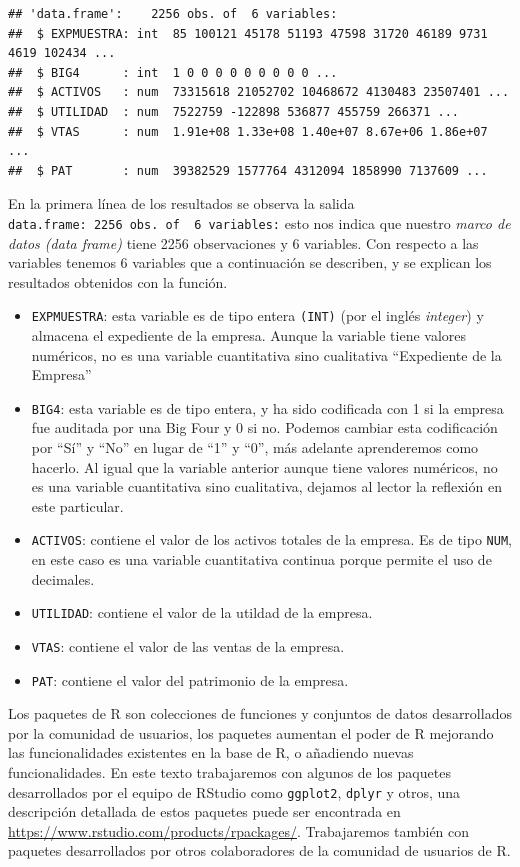 \documentclass[
]{krantz}
\providecommand{\tightlist}{%
  \setlength{\itemsep}{0pt}\setlength{\parskip}{0pt}}
\begin{document}
\begin{verbatim}
## 'data.frame':    2256 obs. of  6 variables:
##  $ EXPMUESTRA: int  85 100121 45178 51193 47598 31720 46189 9731 4619 102434 ...
##  $ BIG4      : int  1 0 0 0 0 0 0 0 0 0 ...
##  $ ACTIVOS   : num  73315618 21052702 10468672 4130483 23507401 ...
##  $ UTILIDAD  : num  7522759 -122898 536877 455759 266371 ...
##  $ VTAS      : num  1.91e+08 1.33e+08 1.40e+07 8.67e+06 1.86e+07 ...
##  $ PAT       : num  39382529 1577764 4312094 1858990 7137609 ...
\end{verbatim}

En la primera línea de los resultados se observa la salida \texttt{\textquotesingle{}data.frame\textquotesingle{}:\ 2256\ obs.\ of\ \ 6\ variables:} esto nos indica que nuestro \emph{marco de datos (data frame)} tiene 2256 observaciones y 6 variables. Con respecto a las variables tenemos 6 variables que a continuación se describen, y se explican los resultados obtenidos con la función.

\begin{itemize}
\tightlist
\item
  \texttt{EXPMUESTRA}: esta variable es de tipo entera \texttt{(INT)} (por el inglés \emph{integer}) y almacena el expediente de la empresa. Aunque la variable tiene valores numéricos, no es una variable cuantitativa sino cualitativa ``Expediente de la Empresa''
\item
  \texttt{BIG4}: esta variable es de tipo entera, y ha sido codificada con 1 si la empresa fue auditada por una Big Four y 0 si no. Podemos cambiar esta codificación por ``Sí'' y ``No'' en lugar de ``1'' y ``0'', más adelante aprenderemos como hacerlo. Al igual que la variable anterior aunque tiene valores numéricos, no es una variable cuantitativa sino cualitativa, dejamos al lector la reflexión en este particular.
\item
  \texttt{ACTIVOS}: contiene el valor de los activos totales de la empresa. Es de tipo \texttt{NUM}, en este caso es una variable cuantitativa continua porque permite el uso de decimales.
\item
  \texttt{UTILIDAD}: contiene el valor de la utildad de la empresa.
\item
  \texttt{VTAS}: contiene el valor de las ventas de la empresa.
\item
  \texttt{PAT}: contiene el valor del patrimonio de la empresa.
\end{itemize}

Los paquetes de R son colecciones de funciones y conjuntos de datos desarrollados por la comunidad de usuarios, los paquetes aumentan el poder de R mejorando las funcionalidades existentes en la base de R, o añadiendo nuevas funcionalidades. En este texto trabajaremos con algunos de los paquetes desarrollados por el equipo de RStudio como \texttt{ggplot2}, \texttt{dplyr} y otros, una descripción detallada de estos paquetes puede ser encontrada en \url{https://www.rstudio.com/products/rpackages/}. Trabajaremos también con paquetes desarrollados por otros colaboradores de la comunidad de usuarios de R.
\end{document}

